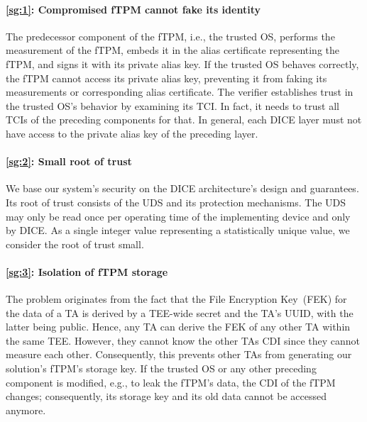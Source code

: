\paragraph{\ref{sg:1}: Compromised fTPM cannot fake its identity}
The predecessor component of the fTPM, i.e., the trusted OS, performs the measurement of the fTPM, embeds it in the alias certificate representing the fTPM, and signs it with its private alias key.
If the trusted OS behaves correctly, the fTPM cannot access its private alias key, preventing it from faking its measurements or corresponding alias certificate.
The verifier establishes trust in the trusted OS's behavior by examining its \ac{TCI}\@.
In fact, it needs to trust all TCIs of the preceding components for that.
In general, each DICE layer must not have access to the private alias key of the preceding layer.

\paragraph{\ref{sg:2}: Small root of trust}
We base our system's security on the DICE architecture's design and guarantees.
Its root of trust consists of the \ac{UDS} and its protection mechanisms.
The \ac{UDS} may only be read once per operating time of the implementing device and only by DICE\@.
As a single integer value representing a statistically unique value, we consider the root of trust small.

\paragraph{\ref{sg:3}: Isolation of fTPM storage}
The problem originates from the fact that the File Encryption Key~(FEK) for the data of a TA is derived by a TEE-wide secret and the TA's UUID, with the latter being public.
Hence, any TA can derive the FEK of any other TA within the same TEE\@.
However, they cannot know the other TAs CDI since they cannot measure each other.
Consequently, this prevents other \acp{TA} from generating our solution's fTPM's storage key.
If the trusted OS or any other preceding component is modified, e.g., to leak the fTPM's data, the CDI of the fTPM changes; consequently, its storage key and its old data cannot be accessed anymore.

